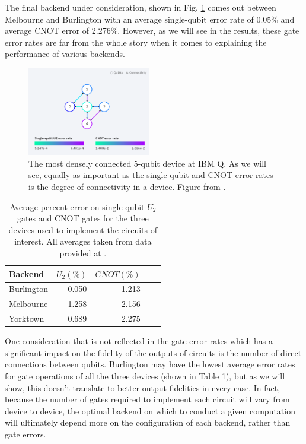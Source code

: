 The final backend under consideration, shown in Fig.
\ref{fig:yorktown_connections} comes out between Melbourne and Burlington with
an average single-qubit error rate of 0.05\% and average CNOT error of 2.276\%.
However, as we will see in the results, these gate error rates are far from the
whole story when it comes to explaining the performance of various backends.
\begin{figure}[h] \centering
\includegraphics[width=0.48\textwidth]{images/connection_diagram_ibmqx2.png}
  \caption{The most densely connected 5-qubit device at IBM Q. As we will see,
equally as important as the single-qubit and CNOT error rates is the degree of
connectivity in a device. Figure from \cite{ibmq_yorktown}.}
  \label{fig:yorktown_connections}
\end{figure}
\newpage
\begin{table} \centering
	\begin{tabular}{lrrrr} \toprule Backend & $U_2 (\%)$ & $CNOT (\%)$ \\ \midrule
		Burlington & 0.050 & 1.213 \\ Melbourne & 1.258 & 2.156 \\ Yorktown & 0.689 &
		2.275 \\ \bottomrule
	\end{tabular}
	\caption{Average percent error on single-qubit $U_2$ gates and CNOT gates for
		the three devices used to implement the circuits of interest. All averages taken
		from data provided at \cite{ibmq_burlington,ibmq_16_melbourne,ibmq_yorktown}.}
	\label{tb:average_errors}
\end{table}
One consideration that is not reflected in the gate error rates which has a
significant impact on the fidelity of the outputs of circuits is the number of
direct connections between qubits. Burlington may have the lowest average error
rates for gate operations of all the three devices (shown in Table
\ref{tb:average_errors}), but as we will show, this doesn't translate to better
output fidelities in every case. In fact, because the number of gates required
to implement each circuit will vary from device to device, the optimal backend
on which to conduct a given computation will ultimately depend more on the
configuration of each backend, rather than gate errors.

